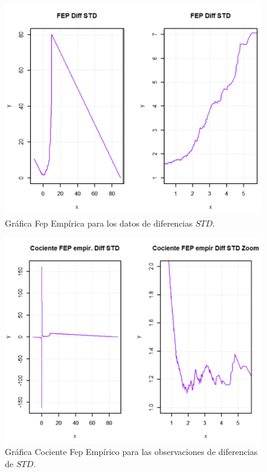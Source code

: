 \documentclass[10.5pt,notitlepage]{article}
\theoremstyle{plain}
\begin{document}
\begin{figure}[htb]
    \centering
    \includegraphics[scale = 0.4]{incisoc/DFepSTD.png}
    \caption{Gráfica Fep Empírica para los datos de diferencias \(STD\).}
    \label{fig:22}
\end{figure}

\begin{figure}[htb]
    \centering
    \includegraphics[scale = 0.4]{incisoc/DCocFepSTD.png}
    \caption{Gráfica Cociente Fep Empírico para las observaciones de diferencias de \(STD\).}
    \label{fig:23}
\end{figure}
\end{document}
